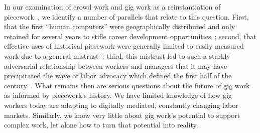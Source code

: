 \documentclass{article}
\newcommand{\topic}[1]{{\color{Blue}#1}}
\begin{document}
\topic{In our examination of crowd work and gig work as a reinstantiation of piecework~\cite{pieceworkCrowdworkGigwork}, we identify a number of parallels that relate to this question.}
First, that the first ``human computers'' were geographically distributed and only retained for several years to stifle career development opportunities~\cite{grier2013computers};
second, that effective uses of historical piecework were generally limited to easily measured work due to a general mistrust~\cite{american1921problem,richards1904anything};
third, this mistrust led to such a starkly adversarial relationship between workers and managers that
it may have precipitated the wave of labor advocacy which defined the first half of the  century~\cite{hart2013rise,hart2016rise}.
What remains then are serious questions about the future of gig work as informed by piecework's history.
We have limited knowledge of how gig workers today are adapting to digitally mediated, constantly changing labor markets.
Similarly, we know very little about gig work's potential to support complex work, let alone how to turn that potential into reality.
\end{document}
